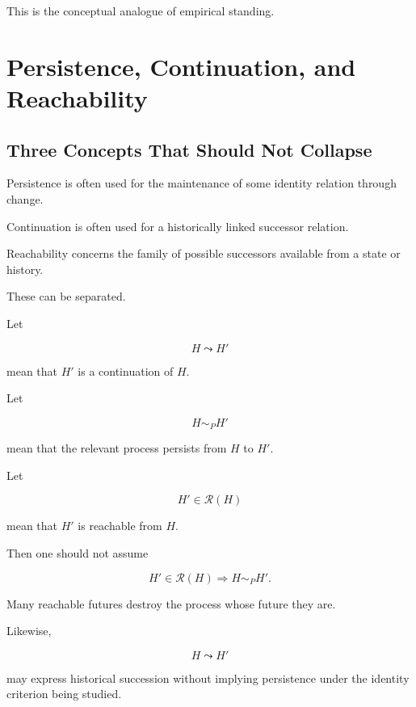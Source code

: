 \documentclass[11pt]{article}
\theoremstyle{remark}
\newcommand{\Reach}{\mathcal{R}}
\begin{document}
This is the conceptual analogue of empirical standing.

\section{Persistence, Continuation, and Reachability}

\subsection{Three Concepts That Should Not Collapse}

Persistence is often used for the maintenance of some identity relation through change.

Continuation is often used for a historically linked successor relation.

Reachability concerns the family of possible successors available from a state or history.

These can be separated.

Let

\begin{equation}
H\leadsto H'
\end{equation}

mean that $H'$ is a continuation of $H$.

Let

\begin{equation}
H\sim_P H'
\end{equation}

mean that the relevant process persists from $H$ to $H'$.

Let

\begin{equation}
H'\in\Reach(H)
\end{equation}

mean that $H'$ is reachable from $H$.

Then one should not assume

\begin{equation}
H'\in\Reach(H)
\Rightarrow
H\sim_P H'.
\end{equation}

Many reachable futures destroy the process whose future they are.

Likewise,

\begin{equation}
H\leadsto H'
\end{equation}

may express historical succession without implying persistence under the identity criterion being studied.
\end{document}
